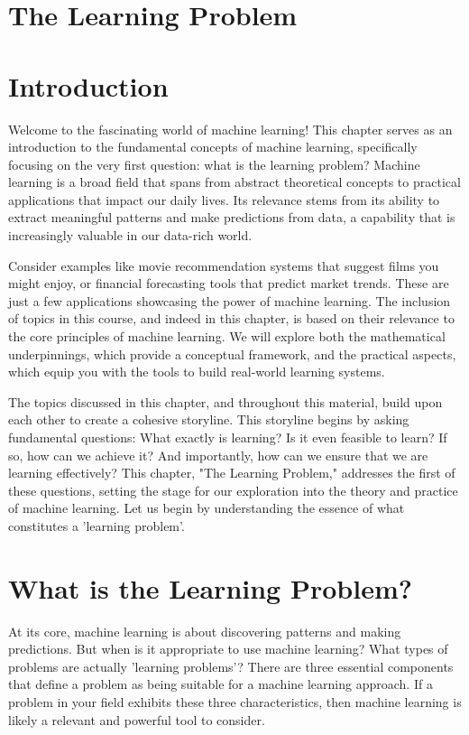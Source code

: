 \documentclass{article}
\begin{document}
\sloppy
\section{The Learning Problem}

\section{Introduction}

Welcome to the fascinating world of machine learning! This chapter serves as an introduction to the fundamental concepts of machine learning, specifically focusing on the very first question: what is the learning problem? Machine learning is a broad field that spans from abstract theoretical concepts to practical applications that impact our daily lives. Its relevance stems from its ability to extract meaningful patterns and make predictions from data, a capability that is increasingly valuable in our data-rich world.

Consider examples like movie recommendation systems that suggest films you might enjoy, or financial forecasting tools that predict market trends. These are just a few applications showcasing the power of machine learning.  The inclusion of topics in this course, and indeed in this chapter, is based on their relevance to the core principles of machine learning. We will explore both the mathematical underpinnings, which provide a conceptual framework, and the practical aspects, which equip you with the tools to build real-world learning systems.

The topics discussed in this chapter, and throughout this material, build upon each other to create a cohesive storyline.  This storyline begins by asking fundamental questions: What exactly is learning? Is it even feasible to learn? If so, how can we achieve it? And importantly, how can we ensure that we are learning effectively? This chapter, "The Learning Problem," addresses the first of these questions, setting the stage for our exploration into the theory and practice of machine learning.  Let us begin by understanding the essence of what constitutes a 'learning problem'.

\section{What is the Learning Problem?}

At its core, machine learning is about discovering patterns and making predictions. But when is it appropriate to use machine learning?  What types of problems are actually 'learning problems'?  There are three essential components that define a problem as being suitable for a machine learning approach. If a problem in your field exhibits these three characteristics, then machine learning is likely a relevant and powerful tool to consider.
\end{document}
